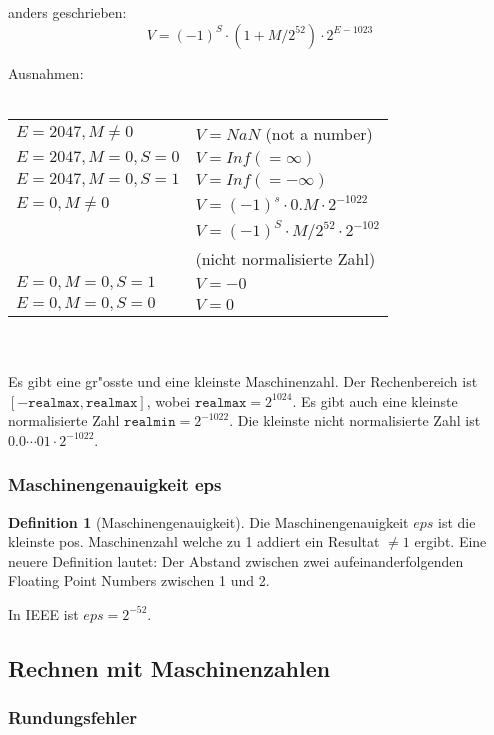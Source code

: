 \documentclass[german, 10pt, a4paper, twocolumn]{scrartcl}
\theoremstyle{definition}
\newtheorem*{definition}{Definition}
\begin{document}
anders geschrieben:
\begin{displaymath}
	V = (-1)^S \cdotp (1+M/2^{52})\cdotp 2^{E-1023}
\end{displaymath}

Ausnahmen:\\\\
\begin{tabular}{l l}
	$E=2047, M\neq 0$ &		$V=NaN$ (not a number)\\
	$E=2047, M=0, S=0$ &		$V=Inf (=\infty)$\\
	$E=2047, M=0, S=1$ &		$V=Inf (=-\infty)$\\
	$E=0, M\neq 0$ &		$V=(-1)^{s}\cdotp 0.M\cdotp 2^{-1022}$\\
	&				$V = (-1)^S \cdotp M/2^{52}\cdotp 2^{-102}$\\
	&				(nicht normalisierte Zahl)\\
	$E=0, M=0, S=1$ &		$V=-0$\\
	$E=0, M=0, S=0$ &		$V=0$
\end{tabular}\\\\

Es gibt eine gr"osste und eine kleinste Maschinenzahl. Der Rechenbereich ist $[-\texttt{realmax}, \texttt{realmax}]$, wobei $\texttt{realmax} = 2^{1024}$. Es gibt auch eine kleinste normalisierte Zahl $\texttt{realmin} = 2^{-1022}$. Die kleinste nicht normalisierte Zahl ist $0.0\cdots 01 \cdotp 2^{-1022}$.\\

\subsubsection{Maschinengenauigkeit eps}

\begin{definition}[Maschinengenauigkeit]
	Die Maschinengenauigkeit $eps$ ist die kleinste pos. Maschinenzahl welche zu 1 addiert ein Resultat $\neq 1$ ergibt. Eine neuere Definition lautet: Der Abstand zwischen zwei aufeinanderfolgenden Floating Point Numbers zwischen 1 und 2.
\end{definition}

In IEEE ist $eps = 2^{-52}$.

\subsection{Rechnen mit Maschinenzahlen}

\subsubsection{Rundungsfehler}
\end{document}
